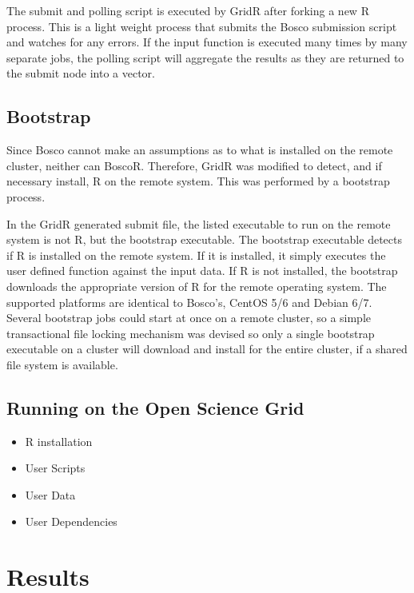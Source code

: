 \documentclass[conference]{IEEEtran}
\begin{document}
The submit and polling script is executed by GridR after forking a new R process.  This is a light weight process that submits the Bosco submission script and watches for any errors.  If the input function is executed many times by many separate jobs, the polling script will aggregate the results as they are returned to the submit node into a vector.  

\subsection{Bootstrap}
\label{sec:bootstrap}

Since Bosco cannot make an assumptions as to what is installed on the remote cluster, neither can BoscoR.  Therefore, GridR was modified to detect, and if necessary install, R on the remote system.  This was performed by a bootstrap process.

In the GridR generated submit file, the listed executable to run on the remote system is not R, but the bootstrap executable.  The bootstrap executable detects if R is installed on the remote system.  If it is installed, it simply executes the user defined function against the input data.  If R is not installed, the bootstrap downloads the appropriate version of R for the remote operating system.  The supported platforms are identical to Bosco's, CentOS 5/6 and Debian 6/7.  Several bootstrap jobs could start at once on a remote cluster, so a simple transactional file locking mechanism was devised so only a single bootstrap executable on a cluster will download and install for the entire cluster, if a shared file system is available.  

\subsection{Running on the Open Science Grid}



\begin{itemize}
\item R installation
\item User Scripts
\item User Data
\item User Dependencies
\end{itemize}



\section{Results}
\end{document}
